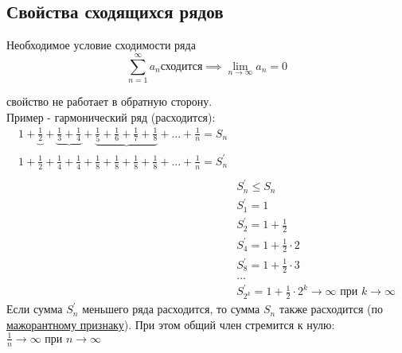 \subsection{Свойства сходящихся рядов}
\begin{sv}
    \label{sv:neob}
    Необходимое условие сходимости ряда
    \begin{equation}
        \sum_{n=1}^{\infty} a_{n} \text{сходится}
        \implies \lim_{n\to\infty} a_{n} = 0
    \end{equation}

    \begin{remark}
        свойство не работает в обратную сторону. \\
        Пример - гармонический ряд (расходится): 
        \begin{equation}
            \begin{align*}
                1 
                + \underbrace{\frac{1}{2}}_{\text{}} 
                + \underbrace{\frac{1}{3} + \frac{1}{4}}_{\text{}} 
                + \underbrace{\frac{1}{5} + \frac{1}{6} + \frac{1}{7} + \frac{1}{8}}_{\text{}}
                + ... 
                + \frac{1}{n}
                = S_{n}
                \\
                1
                + \frac{1}{2}
                + \frac{1}{4} + \frac{1}{4}
                + \frac{1}{8} + \frac{1}{8} + \frac{1}{8} + \frac{1}{8}
                + ... 
                + \frac{1}{n}
                = S^{'}_{n}
                \\
                \\
                &S^{'}_{n} \leq S_{n}\\
                &S^{'}_{1} = 1\\
                &S^{'}_{2} = 1 + \frac{1}{2}\\
                &S^{'}_{4} = 1 + \frac{1}{2}\cdot 2\\
                &S^{'}_{8} = 1 + \frac{1}{2}\cdot 3\\
                &...
                \\
                &S^{'}_{2^{k}} = 1 + \frac{1}{2}\cdot 2^{k} \to\infty \text{ при } k\to\infty
            \end{align*}
        \end{equation}
        Если сумма \(S^{'}_{n}\) меньшего ряда расходится, то сумма \(S_{n}\) также расходится (по \hyperlink{priz:maj}{мажорантному признаку}). 
        При этом общий член стремится к нулю:
        \( \frac{1}{n}\to\infty \text{ при } n\to\infty \)
    \end{remark}
\end{sv}

